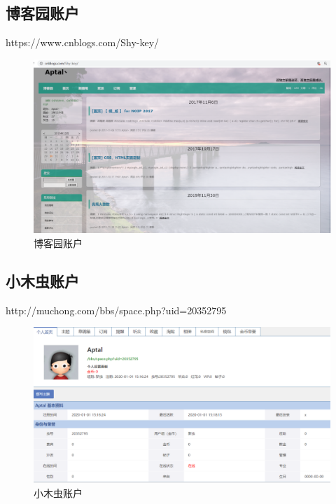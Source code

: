 \documentclass{article}
\begin{document}
\subsection{博客园账户}
https://www.cnblogs.com/Shy-key/\par
\begin{figure}[h!]
	\centering
	\includegraphics[scale=0.25]{cnblogs}
	\caption{博客园账户}
	\label{fig:cnblogs}
\end{figure}

\subsection{小木虫账户}
http://muchong.com/bbs/space.php?uid=20352795\par
\begin{figure}[h!]
	\centering
	\includegraphics[scale=0.3]{smallchong}
	\caption{小木虫账户}
	\label{fig:smallchong}
\end{figure}
\end{document}
